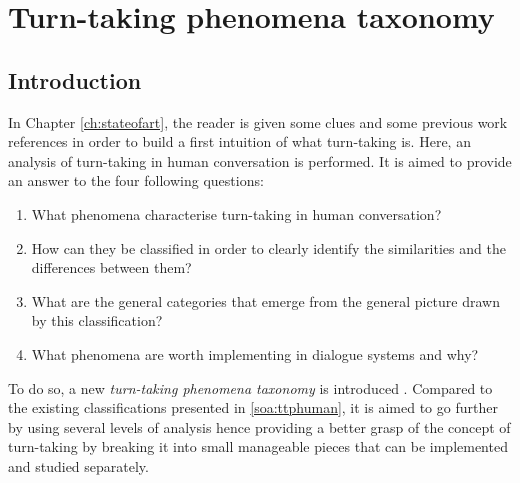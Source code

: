 \chapter{Turn-taking phenomena taxonomy}
\label{ch:taxonomy}

\section{Introduction}
				
				In Chapter \ref{ch:stateofart}, the reader is given some clues and some previous work references in order to build a first intuition of what turn-taking is. Here, an analysis of turn-taking in human conversation is performed. It is aimed to provide an answer to the four following questions:

        \begin{enumerate}
          \item What phenomena characterise turn-taking in human conversation?
          \item How can they be classified in order to clearly identify the similarities and the differences between them?
          \item What are the general categories that emerge from the general picture drawn by this classification?
          \item What phenomena are worth implementing in dialogue systems and why?
        \end{enumerate}
				
				To do so, a new \textit{turn-taking phenomena taxonomy} is introduced \cite{Khouzaimi2015c}. Compared to the existing classifications presented in \ref{soa:ttphuman}, it is aimed to go further by using several levels of analysis hence providing a better grasp of the concept of turn-taking by breaking it into small manageable pieces that can be implemented and studied separately.

